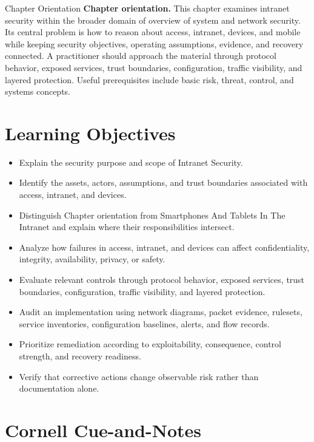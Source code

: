 \documentclass[11pt,letterpaper]{article}
\title{\CornellDocumentTitle}
\author{}
\date{}
\begin{document}
\maketitle
\begin{CornellOverviewBox}{Chapter Orientation}
\textbf{Chapter orientation.} This chapter examines intranet security within the broader domain of overview of system and network security. Its central problem is how to reason about access, intranet, devices, and mobile while keeping security objectives, operating assumptions, evidence, and recovery connected. A practitioner should approach the material through protocol behavior, exposed services, trust boundaries, configuration, traffic visibility, and layered protection. Useful prerequisites include basic risk, threat, control, and systems concepts.
\end{CornellOverviewBox}
\section*{Learning Objectives}
\begin{itemize}
\item Explain the security purpose and scope of Intranet Security.
\item Identify the assets, actors, assumptions, and trust boundaries associated with access, intranet, and devices.
\item Distinguish Chapter orientation from Smartphones And Tablets In The Intranet and explain where their responsibilities intersect.
\item Analyze how failures in access, intranet, and devices can affect confidentiality, integrity, availability, privacy, or safety.
\item Evaluate relevant controls through protocol behavior, exposed services, trust boundaries, configuration, traffic visibility, and layered protection.
\item Audit an implementation using network diagrams, packet evidence, rulesets, service inventories, configuration baselines, alerts, and flow records.
\item Prioritize remediation according to exploitability, consequence, control strength, and recovery readiness.
\item Verify that corrective actions change observable risk rather than documentation alone.
\end{itemize}
\section*{Cornell Cue-and-Notes}
\end{document}
